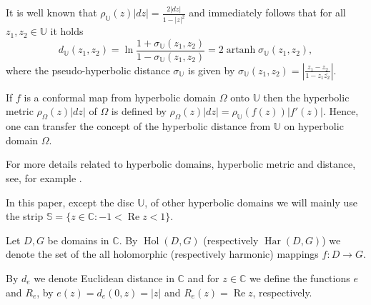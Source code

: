 \documentclass{amsart}
\newcommand{\re}{\mathop{\mathrm{Re}}}
\newcommand{\Hol}{\mathop{\mathrm{Hol}}}
\newcommand{\Har}{\mathop{\mathrm{Har}}}
\newcommand{\artanh}{\mathop{\mathrm{artanh}}}
\begin{document}
It is well known that $\displaystyle\rho_{\mathbb{U}}(z)|dz|=\frac{2|dz|}{1-|z|^2}$ and immediately follows that for all $z_1,z_2\in\mathbb{U}$ it holds
\begin{equation*}
    d_{\mathbb{U}}(z_1,z_2)=\ln\frac{1+\sigma_{\mathbb{U}}(z_1,z_2)}{1-\sigma_{\mathbb{U}}(z_1,z_2)}=2\artanh{\sigma_{\mathbb{U}}(z_1,z_2)},
\end{equation*}
where the pseudo-hyperbolic distance $\sigma_{\mathbb{U}}$ is given by $\displaystyle\sigma_{\mathbb{U}}(z_1,z_2)=\left|\frac{z_1-z_2}{1-z_1\overline{z_2}}\right|$.

If $f$ is a conformal map from hyperbolic domain $\Omega$ onto $\mathbb{U}$ then the hyperbolic metric $\rho_{\Omega}(z)|dz|$ of $\Omega$ is defined by $\rho_{\Omega}(z)|dz|=\rho_{\mathbb{U}}(f(z))|f'(z)|$. Hence, one can transfer the concept of the hyperbolic distance from $\mathbb{U}$ on hyperbolic domain $\Omega$.

For more details related to hyperbolic domains, hyperbolic metric and distance, see, for example \cite{Ahl,BeardonMinda,MMTopics}.

In this paper, except the disc $\mathbb{U}$, of other hyperbolic domains we will mainly use the strip  $\mathbb{S}=\{z\in\mathbb{C}:-1<\re{z}<1\}$.

Let   $D,G$ be  domains in  $\mathbb{C}$. By $\Hol(D,G)$ (respectively $\Har(D,G)$) we denote the set of the all holomorphic (respectively harmonic) mappings $f:D\rightarrow G$.

By $d_e$ we denote Euclidean distance in $\mathbb{C}$ and for $z\in\mathbb{C}$ we define the functions $e$ and $R_e$,  by  $e(z)=d_e(0,z)=|z|$ and $R_e(z)= \re{z}$, respectively.


%
\end{document}
